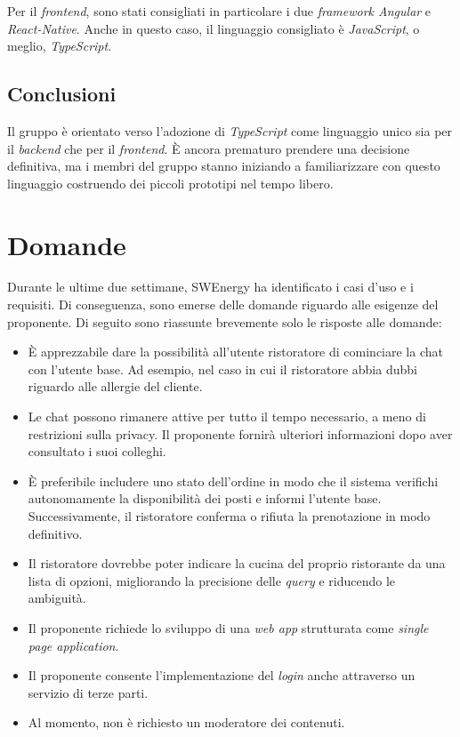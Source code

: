 Per il \textit{frontend}, sono stati consigliati in particolare i due
\textit{framework Angular} e \textit{React-Native}. Anche in questo caso, il
linguaggio consigliato è \textit{JavaScript}, o meglio, \textit{TypeScript}.

\subsection{Conclusioni}

Il gruppo è orientato verso l'adozione di \textit{TypeScript} come linguaggio
unico sia per il \textit{backend} che per il \textit{frontend}. È ancora 
prematuro prendere una decisione definitiva, ma i membri del gruppo
stanno iniziando a familiarizzare con questo linguaggio costruendo dei
piccoli prototipi nel tempo libero.

\section{Domande}

Durante le ultime due settimane, SWEnergy ha identificato i casi d'uso e i
requisiti. Di conseguenza, sono emerse delle domande riguardo alle esigenze
del proponente. Di seguito sono riassunte brevemente solo le risposte alle
domande:

\begin{itemize}
	\item È apprezzabile dare la possibilità all'utente ristoratore di
	      cominciare la chat con l'utente base. Ad esempio, nel caso in cui il
	      ristoratore abbia dubbi riguardo alle allergie del cliente.

	\item Le chat possono rimanere attive per tutto il tempo necessario, a meno
	      di restrizioni sulla privacy. Il proponente fornirà ulteriori
	      informazioni dopo aver consultato i suoi colleghi.

	\item È preferibile includere uno stato dell'ordine in modo che il sistema
	      verifichi autonomamente la disponibilità dei posti e informi l'utente
	      base. Successivamente, il ristoratore conferma o rifiuta la
	      prenotazione in modo definitivo.

	\item Il ristoratore dovrebbe poter indicare la cucina del proprio
	      ristorante da una lista di opzioni, migliorando la precisione delle
	      \textit{query} e riducendo le ambiguità.

	\item Il proponente richiede lo sviluppo di una \textit{web app}
	      strutturata come \textit{single page application}.

	\item Il proponente consente l'implementazione del \textit{login} anche
	      attraverso un servizio di terze parti.

	\item Al momento, non è richiesto un moderatore dei contenuti.
\end{itemize}

